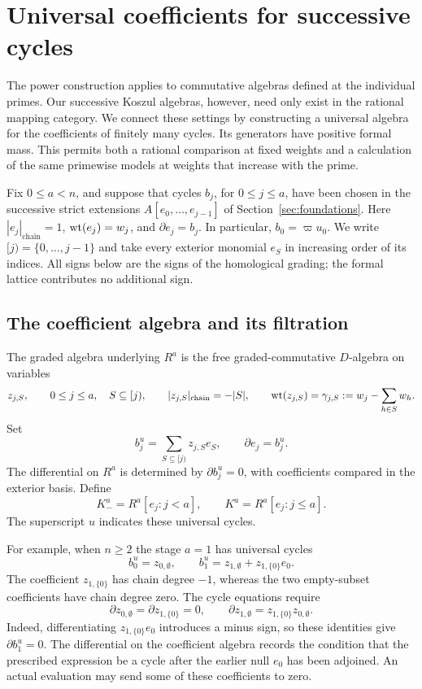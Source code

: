 \section{Universal coefficients for successive cycles}
\label{sec:universal}

The power construction applies to commutative algebras defined at the
individual primes. Our successive Koszul algebras, however, need only
exist in the rational mapping category. We connect these settings by
constructing a universal algebra for the coefficients of finitely many
cycles. Its generators have positive formal mass. This permits both a
rational comparison at fixed weights and a calculation of the same
primewise models at weights that increase with the prime.

Fix $0\leq a<n$, and suppose that cycles $b_j$, for $0\leq j\leq a$,
have been chosen in the successive strict extensions
$A[e_0,\ldots,e_{j-1}]$ of Section~\ref{sec:foundations}.
Here $|e_j|_{\mathrm{chain}}=1$, $\operatorname{wt}(e_j)=w_j$, and
$\partial e_j=b_j$. In particular, $b_0=\varpi u_0$.
We write $[j)=\{0,\ldots,j-1\}$ and take every exterior monomial
$e_S$ in increasing order of its indices. All signs below are the
signs of the homological grading; the formal lattice contributes no
additional sign.

\subsection{The coefficient algebra and its filtration}

\begin{definition}\label{universal:coefficients}
The graded algebra underlying $R^a$ is the free graded-commutative
$D$-algebra on variables
\[
 z_{j,S},\qquad 0\leq j\leq a,\quad S\subseteq[j),
 \qquad |z_{j,S}|_{\mathrm{chain}}=-|S|,
 \qquad \operatorname{wt}(z_{j,S})=\gamma_{j,S}
       :=w_j-\sum_{h\in S}w_h.
\]
Set
\[
 b_j^u=\sum_{S\subseteq[j)}z_{j,S}e_S,
 \qquad \partial e_j=b_j^u.
\]
The differential on $R^a$ is determined by
$\partial b_j^u=0$, with coefficients compared in the exterior basis.
Define
\[
 K_-^a=R^a[e_j:j<a],\qquad K^a=R^a[e_j:j\leq a].
\]
The superscript $u$ indicates these universal cycles.
\end{definition}

For example, when $n\geq2$ the stage $a=1$ has universal cycles
\[
 b_0^u=z_{0,\emptyset},\qquad
 b_1^u=z_{1,\emptyset}+z_{1,\{0\}}e_0.
\]
The coefficient $z_{1,\{0\}}$ has chain degree $-1$, whereas the
two empty-subset coefficients have chain degree zero. The cycle
equations require
\[
 \partial z_{0,\emptyset}=\partial z_{1,\{0\}}=0,
 \qquad
 \partial z_{1,\emptyset}=z_{1,\{0\}}z_{0,\emptyset}.
\]
Indeed, differentiating $z_{1,\{0\}}e_0$ introduces a minus sign,
so these identities give $\partial b_1^u=0$. The differential on
the coefficient algebra records the condition that the prescribed
expression be a cycle after the earlier null $e_0$ has been adjoined.
An actual evaluation may send some of these coefficients to zero.

